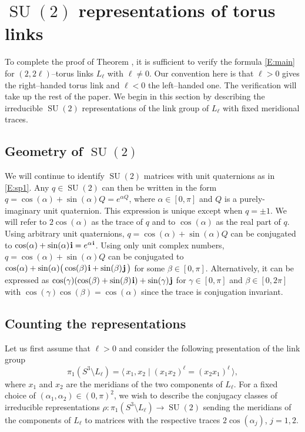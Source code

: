 \documentclass[11pt,reqno]{amsart}
\theoremstyle{definition}
\renewcommand{\i}{\mspace{1.5mu}\mathbf i}
\renewcommand{\j}{\mspace{1.5mu}\mathbf j}
\newcommand{\SU}{\operatorname{SU}}
\begin{document}
\begin{sloppypar}

\section{$\SU(2)$ representations of torus links}\label{sec:count-rep}
To complete the proof of Theorem , it is sufficient to verify the formula \eqref{E:main} for $(2,2\ell)$--torus links $L_{\ell}$ with $\ell \neq 0$. Our convention here is that $\ell > 0$ gives the right--handed torus link and $\ell < 0$ the left--handed one. The verification will take up the rest of the paper. We begin in this section by describing the irreducible $\SU(2)$ representations of the link group of $L_{\ell}$ with fixed meridional traces.


\subsection{Geometry of $\SU(2)$}
We will continue to identify $\SU(2)$ matrices with unit quaternions as in \eqref{E:sp1}. Any $q \in \SU(2)$ can then be written in the form $q = \cos(\alpha) + \sin(\alpha) Q = e^{\alpha Q}$, where $\alpha \in [0, \pi]$ and $Q$ is a purely-imaginary unit quaternion. This expression is unique except when $q = \pm 1$. We will refer to $2 \cos(\alpha)$ as the trace of $q$ and to $\cos(\alpha)$ as the real part of $q$. Using arbitrary unit quaternions, $q = \cos(\alpha) + \sin(\alpha) Q$ can be conjugated to $\cos(\alpha) + \sin(\alpha) \i = e^{\alpha \i}$. Using only unit complex numbers, $q = \cos(\alpha) + \sin(\alpha) Q$ can be conjugated to $\cos(\alpha) + \sin(\alpha) \big(\cos(\beta) \i + \sin(\beta) \j \,\big)$ for some $\beta \in [0, \pi]$. Alternatively, it can be expressed as $\cos(\gamma) (\cos(\beta) + \sin(\beta) \i) + \sin(\gamma) \j$ for $\gamma \in [0, \pi]$ and $\beta \in [0,2 \pi]$ with $\cos(\gamma) \cos(\beta) = \cos(\alpha)$ since the trace is conjugation invariant.


\subsection{Counting the representations}\label{S:reps}
Let us first assume that $\ell > 0$ and consider the following presentation of the link group
\[
\pi_1(S^3 \setminus L_{\ell}) = \big\langle\, x_1, x_2\; \big|\; (x_1 x_2)^{\ell} = (x_2x_1)^{\ell} \,\big\rangle,
\]
where $x_1$ and $x_2$ are the meridians of the two components of $L_{\ell}$. For a fixed choice of $(\alpha_1, \alpha_2) \in (0, \pi)^2$, we wish to describe the conjugacy classes of irreducible representations $\rho: \pi_1(S^3 \setminus L_{\ell}) \to \SU(2)$ sending the meridians of the components of $L_{\ell}$ to matrices with the respective traces $2\cos(\alpha_j)$, $j = 1, 2$.


\end{sloppypar}
\end{document}
